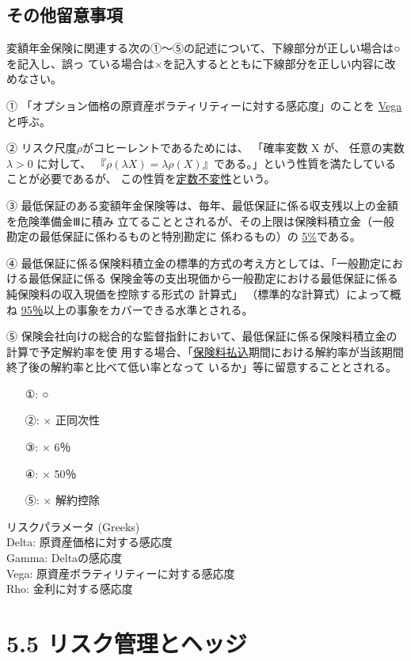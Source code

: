 \documentclass[report,gutter=10mm,fore-edge=10mm,uplatex,dvipdfmx]{jlreq}
\begin{document}
{\subsection{その他留意事項}
変額年金保険に関連する次の①～⑤の記述について、下線部分が正しい場合は○を記入し、誤っ
ている場合は×を記入するとともに下線部分を正しい内容に改めなさい。

① 「オプション価格の原資産ボラティリティーに対する感応度」のことを \underline{Vega} と呼ぶ。

② リスク尺度$\rho$がコヒーレントであるためには、
「確率変数 X が、
任意の実数$\lambda>0$ に対して、
『$\rho(\lambda X)=\lambda\rho(X)$』である。」という性質を満たしていることが必要であるが、
この性質を\underline{定数不変性}という。

③ 最低保証のある変額年金保険等は、毎年、最低保証に係る収支残以上の金額を危険準備金Ⅲに積み
立てることとされるが、その上限は保険料積立金（一般勘定の最低保証に係わるものと特別勘定に
係わるもの）の \underline{5\%}である。

④ 最低保証に係る保険料積立金の標準的方式の考え方としては、「一般勘定における最低保証に係る
保険金等の支出現価から一般勘定における最低保証に係る純保険料の収入現価を控除する形式の
計算式」
（標準的な計算式）によって概ね \underline{95％}以上の事象をカバーできる水準とされる。

⑤ 保険会社向けの総合的な監督指針において、最低保証に係る保険料積立金の計算で予定解約率を使
用する場合、「\underline{保険料払込}期間における解約率が当該期間終了後の解約率と比べて低い率となって
いるか」等に留意することとされる。
\answer{}
\begin{itemize}
\item[①: ]  ○
\item[②: ]  × 正同次性
\item[③: ]  × 6％
\item[④: ]  × 50％
\item[⑤: ]  × 解約控除
\end{itemize}

リスクパラメータ (Greeks)\\
Delta: 原資産価格に対する感応度\\
Gamma: Deltaの感応度\\
Vega: 原資産ボラティリティーに対する感応度\\
Rho: 金利に対する感応度

\section{5.5 リスク管理とヘッジ}
}
\end{document}
